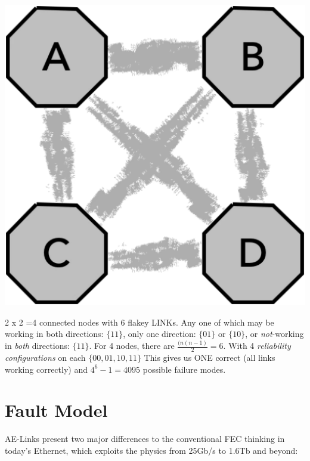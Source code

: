\documentclass[../OAE-SPEC-MAIN.tex]{subfiles}
\begin{document}
 \begin{marginfigure}
      \includegraphics[width=\linewidth]{../../FIGURES/Quadpartite-discovery.pdf}
  \caption{2 x 2 =4  connected nodes with 6 flakey LINKs. Any one of which may be working in both directions: $\{11\}$, only one direction: $\{01\}$ or $\{10\}$, or \emph{not}-working in  \emph{both} directions: $\{11\}$. For 4 nodes, there are $\frac{(n(n-1)}{2} = 6$. With 4  \emph{reliability configurations} on each \LINK $\{00,01,10,11\}$ This gives us ONE correct (all links working correctly) and  $4^6-1 = 4095$ possible failure modes.}%
   \vspace{10pt}
\end{marginfigure}



\section{Fault Model}


AE-Links present two major differences to the conventional FEC thinking in today's Ethernet, which exploits the physics from 25Gb/s to 1.6Tb and beyond:
\end{document}
